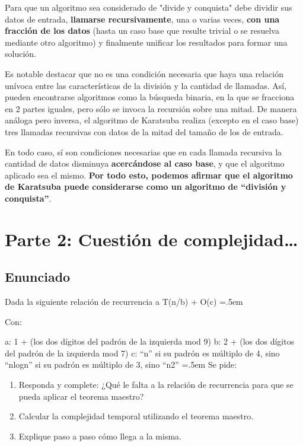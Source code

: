 \documentclass[titlepage,a4paper]{article}
\newenvironment{lcverbatim}
 {\SaveVerbatim{cverb}}
 {\endSaveVerbatim
  \flushleft\fboxrule=0pt\fboxsep=.5em
  \colorbox{cverbbg}{%
    \makebox[\dimexpr\linewidth-2\fboxsep][l]{\BUseVerbatim{cverb}}%
  }
  \endflushleft
}
\begin{document}
Para que un algoritmo sea considerado de "divide y conquista" debe dividir sus datos de entrada, \textbf{llamarse recursivamente}, una o varias veces, \textbf{con una fracción de los datos} (hasta un caso base que resulte trivial o se resuelva mediante otro algoritmo) y finalmente unificar los resultados para formar una solución.

Es notable destacar que no es una condición necesaria que haya una relación unívoca entre las características de la división y la cantidad de llamadas. Así, pueden encontrarse algoritmos como la búsqueda binaria, en la que se fracciona en 2 partes iguales, pero sólo se invoca la recursión sobre una mitad. De manera análoga pero inversa, el algoritmo de Karatsuba realiza (excepto en el caso base) tres llamadas recursivas con datos de la mitad del tamaño de los de entrada.

En todo caso, sí son condiciones necesarias que en cada llamada recursiva la cantidad de datos disminuya \textbf{acercándose al caso base}, y que el algoritmo aplicado sea el mismo. \textbf{Por todo esto, podemos afirmar que el algoritmo de Karatsuba puede considerarse como un algoritmo de “división y conquista”}.





\newpage\section{Parte 2: Cuestión de complejidad…}\label{sec:parte2}

\subsection{Enunciado}

Dada la siguiente relación de recurrencia
\begin{lcverbatim}
    a T(n/b) + O(c)
\end{lcverbatim}

Con:

\begin{lcverbatim}
a: 1 + (los dos dígitos del padrón de la izquierda mod 9)
b: 2 + (los dos dígitos del padrón de la izquierda mod 7)
c: “n” si su padrón es múltiplo de 4, 
   sino “nlogn” si su padrón es múltiplo de 3,
   sino “n2”  \end{lcverbatim}
\noindent Se pide:
\begin{enumerate}
\item Responda y complete: ¿Qué le falta a la relación de recurrencia para que se pueda aplicar el teorema maestro?

\item Calcular la complejidad temporal utilizando el teorema maestro.

\item Explique paso a paso cómo llega a la misma.

\end{enumerate}
\end{document}
